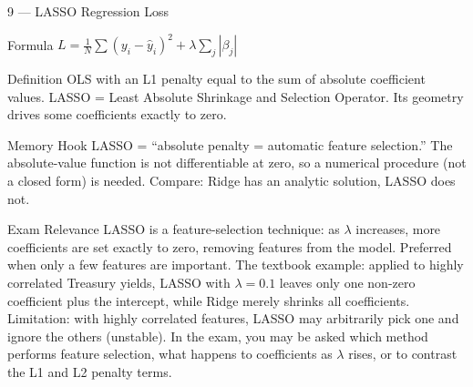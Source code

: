 \documentclass[aspectratio=169,8pt]{beamer}
\begin{document}
	\begin{frame}{9 --- LASSO Regression Loss}
		\begin{block}{Formula}
			$L = \frac{1}{N}\sum(y_i - \hat{y}_i)^2 + \lambda\sum_j |\beta_j|$
		\end{block}
		\begin{block}{Definition}
			OLS with an L1 penalty equal to the sum of absolute coefficient values. LASSO = Least Absolute Shrinkage and Selection Operator. Its geometry drives some coefficients exactly to zero.
		\end{block}
		\begin{block}{Memory Hook}
			LASSO = ``absolute penalty = automatic feature selection.'' The absolute-value function is not differentiable at zero, so a numerical procedure (not a closed form) is needed. Compare: Ridge has an analytic solution, LASSO does not.
		\end{block}
		\begin{block}{Exam Relevance}
			LASSO is a feature-selection technique: as $\lambda$ increases, more coefficients are set exactly to zero, removing features from the model. Preferred when only a few features are important. The textbook example: applied to highly correlated Treasury yields, LASSO with $\lambda = 0.1$ leaves only one non-zero coefficient plus the intercept, while Ridge merely shrinks all coefficients. Limitation: with highly correlated features, LASSO may arbitrarily pick one and ignore the others (unstable). In the exam, you may be asked which method performs feature selection, what happens to coefficients as $\lambda$ rises, or to contrast the L1 and L2 penalty terms.
		\end{block}
	\end{frame}
	
\end{document}

